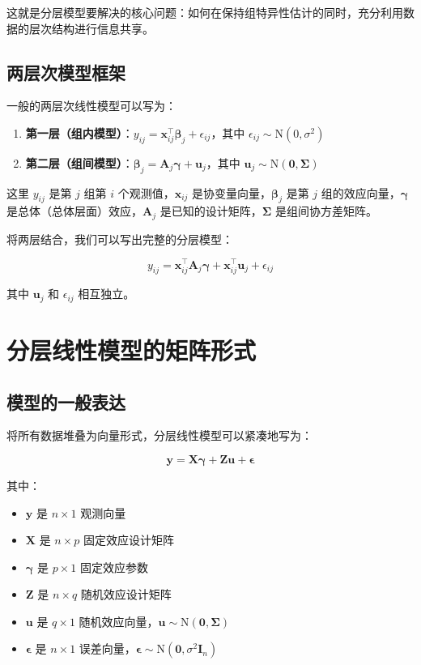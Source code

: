 这就是分层模型要解决的核心问题：如何在保持组特异性估计的同时，充分利用数据的层次结构进行信息共享。

\subsection{两层次模型框架}
\label{sec:two-level-framework}

一般的两层次线性模型可以写为：

\begin{enumerate}
  \item \textbf{第一层（组内模型）}：$y_{ij} = \mathbf{x}_{ij}^\top \boldsymbol{\beta}_j + \epsilon_{ij}$，其中 $\epsilon_{ij} \sim \mathrm{N}(0, \sigma^2)$
  \item \textbf{第二层（组间模型）}：$\boldsymbol{\beta}_j = \mathbf{A}_j \boldsymbol{\gamma} + \mathbf{u}_j$，其中 $\mathbf{u}_j \sim \mathrm{N}(\mathbf{0}, \boldsymbol{\Sigma})$
\end{enumerate}

这里 $y_{ij}$ 是第 $j$ 组第 $i$ 个观测值，$\mathbf{x}_{ij}$ 是协变量向量，$\boldsymbol{\beta}_j$ 是第 $j$ 组的效应向量，$\boldsymbol{\gamma}$ 是总体（总体层面）效应，$\mathbf{A}_j$ 是已知的设计矩阵，$\boldsymbol{\Sigma}$ 是组间协方差矩阵。

将两层结合，我们可以写出完整的分层模型：

\[
y_{ij} = \mathbf{x}_{ij}^\top \mathbf{A}_j \boldsymbol{\gamma} + \mathbf{x}_{ij}^\top \mathbf{u}_j + \epsilon_{ij}
\]

其中 $\mathbf{u}_j$ 和 $\epsilon_{ij}$ 相互独立。

\section{分层线性模型的矩阵形式}
\label{sec:matrix-formulation}

\subsection{模型的一般表达}
\label{sec:general-matrix-form}

将所有数据堆叠为向量形式，分层线性模型可以紧凑地写为：

\[
\mathbf{y} = \mathbf{X}\boldsymbol{\gamma} + \mathbf{Z}\mathbf{u} + \boldsymbol{\epsilon}
\]

其中：
\begin{itemize}
  \item $\mathbf{y}$ 是 $n \times 1$ 观测向量
  \item $\mathbf{X}$ 是 $n \times p$ 固定效应设计矩阵
  \item $\boldsymbol{\gamma}$ 是 $p \times 1$ 固定效应参数
  \item $\mathbf{Z}$ 是 $n \times q$ 随机效应设计矩阵
  \item $\mathbf{u}$ 是 $q \times 1$ 随机效应向量，$\mathbf{u} \sim \mathrm{N}(\mathbf{0}, \boldsymbol{\Sigma})$
  \item $\boldsymbol{\epsilon}$ 是 $n \times 1$ 误差向量，$\boldsymbol{\epsilon} \sim \mathrm{N}(\mathbf{0}, \sigma^2 \mathbf{I}_n)$
\end{itemize}

